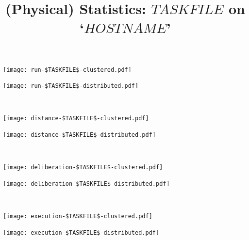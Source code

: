 \documentclass[11pt,a4paper]{article}
\title{(Physical) Statistics: $TASKFILE$ on `$HOSTNAME$'}
\author{}
\date{}
\begin{document}
\maketitle

\noindent
\begin{minipage}{0.5\textwidth}
\texttt{[image: run-\$TASKFILE\$-clustered.pdf]}
\end{minipage}
\begin{minipage}{0.5\textwidth}
\texttt{[image: run-\$TASKFILE\$-distributed.pdf]}
\end{minipage}
\\[0.2cm]


\noindent
\begin{minipage}{0.5\textwidth}
\texttt{[image: distance-\$TASKFILE\$-clustered.pdf]}
\end{minipage}
\begin{minipage}{0.5\textwidth}
\texttt{[image: distance-\$TASKFILE\$-distributed.pdf]}
\end{minipage}
\\[0.5cm]

\noindent
\begin{minipage}{0.5\textwidth}
\texttt{[image: deliberation-\$TASKFILE\$-clustered.pdf]}
\end{minipage}
\begin{minipage}{0.5\textwidth}
\texttt{[image: deliberation-\$TASKFILE\$-distributed.pdf]}
\end{minipage}
\\[0.2cm]

\noindent
\begin{minipage}{0.5\textwidth}
\texttt{[image: execution-\$TASKFILE\$-clustered.pdf]}
\end{minipage}
\begin{minipage}{0.5\textwidth}
\texttt{[image: execution-\$TASKFILE\$-distributed.pdf]}
\end{minipage}
\\[0.2cm]
\end{document}
